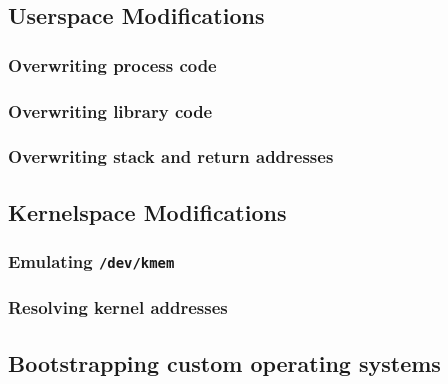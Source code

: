 \subsection{Userspace Modifications}

\subsubsection{Overwriting process code}

\subsubsection{Overwriting library code}

\subsubsection{Overwriting stack and return addresses}




\subsection{Kernelspace Modifications}

\subsubsection{Emulating \texttt{/dev/kmem}}

\subsubsection{Resolving kernel addresses}





\subsection{Bootstrapping custom operating systems}



